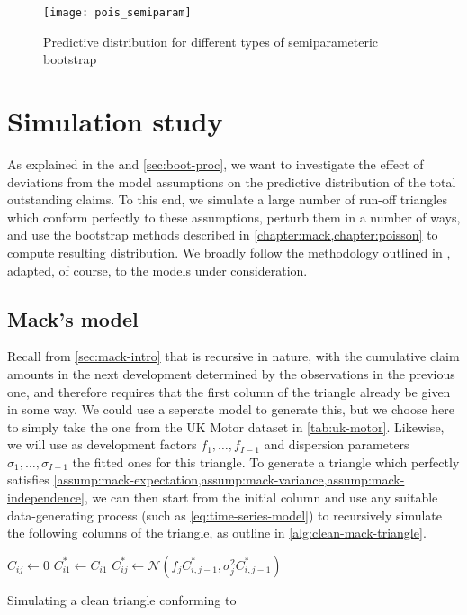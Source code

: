 \documentclass[a4paper]{book}
\begin{document}
\begin{figure}[!htb]
  \texttt{[image: pois\_semiparam]}
  \caption{Predictive distribution for different types of semiparameteric bootstrap}
  \label{fig:pred-semiparam}
\end{figure}


\chapter{Simulation study}

As explained in the  and \cref{sec:boot-proc}, we want to investigate the effect of deviations from the model assumptions on the predictive distribution of the total outstanding claims. To this end, we simulate a large number of run-off triangles which conform perfectly to these assumptions, perturb them in a number of ways, and use the bootstrap methods described in \cref{chapter:mack,chapter:poisson} to compute resulting distribution. We broadly follow the methodology outlined in \cite{schiegl}, adapted, of course, to the models under consideration.

\section{Mack's model}

Recall from \cref{sec:mack-intro} that  is recursive in nature, with the cumulative claim amounts in the next development determined by the observations in the previous one, and therefore requires that the first column of the triangle already be given in some way. We could use a seperate model to generate this, but we choose here to simply take the one from the UK Motor dataset in \cref{tab:uk-motor}. Likewise, we will use as development factors $f_1, \dots, f_{I - 1}$ and dispersion parameters $\sigma_1, \dots, \sigma_{I - 1}$ the fitted ones for this triangle. To generate a triangle which perfectly satisfies \cref{assump:mack-expectation,assump:mack-variance,assump:mack-independence}, we can then start from the initial column and use any suitable data-generating process (such as \cref{eq:time-series-model}) to recursively simulate the following columns of the triangle, as outline in \cref{alg:clean-mack-triangle}.

\begin{algorithm}[!htb]
  \begin{algorithmic}
      \State $C_{ij} \gets 0$
    \EndFor
      \State $C^*_{i1} \gets C_{i1}$
        \State $C^*_{ij} \gets \mathcal{N}(f_j C^*_{i, j - 1}, \sigma_j^2 C^*_{i, j - 1})$
      \EndFor
    \EndFor
    \State {}
  \end{algorithmic}
  \caption{Simulating a clean triangle conforming to }
  \label{alg:clean-mack-triangle}
\end{algorithm}
\end{document}

